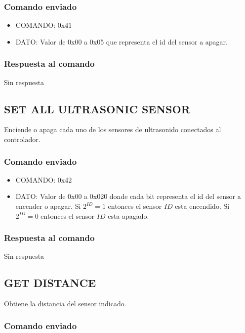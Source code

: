 \documentclass[a4paper,10pt]{article}
\begin{document}
\subsubsection*{Comando enviado}

\begin{itemize}
	\item{COMANDO:} 0x41
	\item{DATO:} Valor de 0x00 a 0x05 que representa el id del sensor a apagar.
\end{itemize}

\subsubsection*{Respuesta al comando}

Sin respuesta

\subsection{SET ALL ULTRASONIC SENSOR}
\label{set_all_ultrasonic_sensor}

Enciende o apaga cada uno de los sensores de ultrasonido conectados al controlador.

\subsubsection*{Comando enviado}

\begin{itemize}
	\item{COMANDO:} 0x42
	\item{DATO:} Valor de 0x00 a 0x020 donde cada bit representa el id del sensor a encender o apagar.
	Si $2^{ID} = 1$ entonces el sensor $ID$ esta encendido.
	Si $2^{ID} = 0$ entonces el sensor $ID$ esta apagado.
\end{itemize}

\subsubsection*{Respuesta al comando}

Sin respuesta

\subsection{GET DISTANCE}
\label{get_distance_us}

Obtiene la distancia del sensor indicado.

\subsubsection*{Comando enviado}
\end{document}
